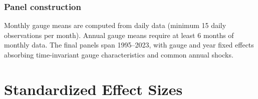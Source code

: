 \documentclass[12pt]{article}
\begin{document}
\subsubsection*{Panel construction} Monthly gauge means are computed from daily data (minimum 15 daily observations per month). Annual gauge means require at least 6 months of monthly data. The final panels span 1995--2023, with gauge and year fixed effects absorbing time-invariant gauge characteristics and common annual shocks.

\section{Standardized Effect Sizes}
\label{sec:sde}


\end{document}
